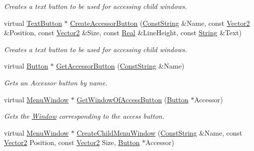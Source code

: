 \begin{DoxyCompactItemize}
\begin{DoxyCompactList}\small\item\em Creates a text button to be used for accessing child windows. \item\end{DoxyCompactList}\item 
virtual \hyperlink{classphys_1_1UI_1_1TextButton}{TextButton} $\ast$ \hyperlink{classphys_1_1UI_1_1MenuWindow_af01f7af9762ab42864b49fbdfe25412d}{CreateAccessorButton} (\hyperlink{namespacephys_a5ce5049f8b4bf88d6413c47b504ebb31}{ConstString} \&Name, const \hyperlink{classphys_1_1Vector2}{Vector2} \&Position, const \hyperlink{classphys_1_1Vector2}{Vector2} \&Size, const \hyperlink{namespacephys_af7eb897198d265b8e868f45240230d5f}{Real} \&LineHeight, const \hyperlink{namespacephys_aa03900411993de7fbfec4789bc1d392e}{String} \&Text)
\begin{DoxyCompactList}\small\item\em Creates a text button to be used for accessing child windows. \item\end{DoxyCompactList}\item 
virtual \hyperlink{classphys_1_1UI_1_1Button}{Button} $\ast$ \hyperlink{classphys_1_1UI_1_1MenuWindow_a7ee13fd6573f8c6d4f6c4992d414e7c2}{GetAccessorButton} (\hyperlink{namespacephys_a5ce5049f8b4bf88d6413c47b504ebb31}{ConstString} \&Name)
\begin{DoxyCompactList}\small\item\em Gets an Accessor button by name. \item\end{DoxyCompactList}\item 
virtual \hyperlink{classphys_1_1UI_1_1MenuWindow}{MenuWindow} $\ast$ \hyperlink{classphys_1_1UI_1_1MenuWindow_a12b1586cd33bc03b5902018376878961}{GetWindowOfAccessButton} (\hyperlink{classphys_1_1UI_1_1Button}{Button} $\ast$Accessor)
\begin{DoxyCompactList}\small\item\em Gets the \hyperlink{classphys_1_1UI_1_1Window}{Window} corresponding to the access button. \item\end{DoxyCompactList}\item 
virtual \hyperlink{classphys_1_1UI_1_1MenuWindow}{MenuWindow} $\ast$ \hyperlink{classphys_1_1UI_1_1MenuWindow_a5b4945e253037695a8ea7d09560dd9d8}{CreateChildMenuWindow} (\hyperlink{namespacephys_a5ce5049f8b4bf88d6413c47b504ebb31}{ConstString} \&Name, const \hyperlink{classphys_1_1Vector2}{Vector2} Position, const \hyperlink{classphys_1_1Vector2}{Vector2} Size, \hyperlink{classphys_1_1UI_1_1Button}{Button} $\ast$Accessor)

\end{DoxyCompactItemize}

